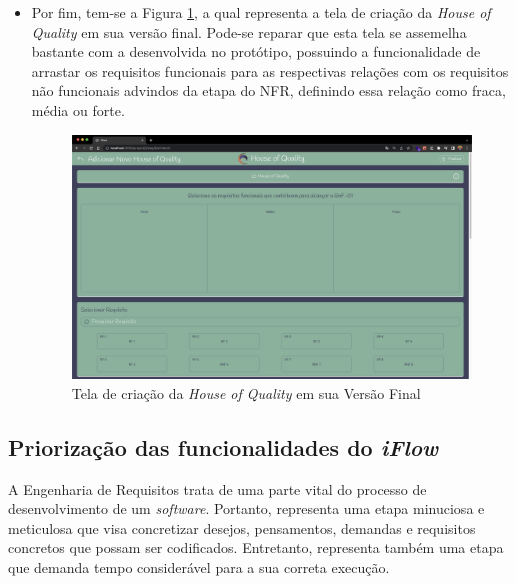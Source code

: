 \begin{itemize}
    \item Por fim, tem-se a Figura \ref{fig:house_of_quality_implementado}, a qual representa a tela de criação da \textit{House of Quality} em sua versão final. Pode-se reparar que esta tela se assemelha bastante com a desenvolvida no protótipo, possuindo a funcionalidade de arrastar os requisitos funcionais para as respectivas relações com os requisitos não funcionais advindos da etapa do NFR, definindo essa relação como fraca, média ou forte.
    \begin{figure}[]
      \begin{center}
          \caption{{Tela de criação da \textit{House of Quality} em sua Versão Final}}
          \label{fig:house_of_quality_implementado}
          \includegraphics[scale=0.22]{figuras/TelasDesenvolvidas/house-of-quality-implementada.png}
    \end{center}
    \end{figure}

\end{itemize}

\subsection{Priorização das funcionalidades do \textit{iFlow}}

\label{sec:priorizacao_iFlow}

A Engenharia de Requisitos trata de uma parte vital do processo de desenvolvimento de um \textit{software}. Portanto, representa uma etapa minuciosa e meticulosa que visa concretizar desejos, pensamentos, demandas e requisitos concretos que possam ser codificados. Entretanto, representa também uma etapa que demanda tempo considerável para a sua correta execução.

